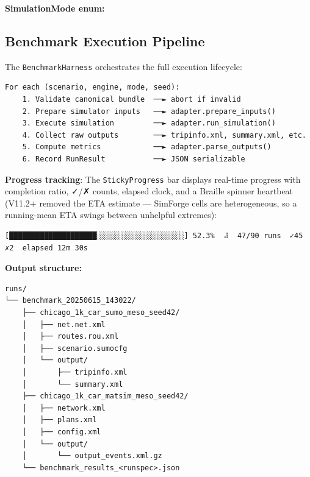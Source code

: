 \textbf{SimulationMode enum:}

\begin{Shaded}
\begin{Highlighting}[]
\OperatorTok{=}   
\OperatorTok{=}     
\end{Highlighting}
\end{Shaded}

\subsection{Benchmark Execution
Pipeline}\label{352-benchmark-execution-pipeline}

The \texttt{BenchmarkHarness} orchestrates the full execution lifecycle:

\begin{verbatim}
For each (scenario, engine, mode, seed):
    1. Validate canonical bundle  ──► abort if invalid
    2. Prepare simulator inputs   ──► adapter.prepare_inputs()
    3. Execute simulation         ──► adapter.run_simulation()
    4. Collect raw outputs        ──► tripinfo.xml, summary.xml, etc.
    5. Compute metrics            ──► adapter.parse_outputs()
    6. Record RunResult           ──► JSON serializable
\end{verbatim}

\textbf{Progress tracking}: The \texttt{StickyProgress} bar displays
real-time progress with completion ratio, ✓/✗ counts, elapsed clock, and
a Braille spinner heartbeat (V11.2+ removed the ETA estimate ---
SimForge cells are heterogeneous, so a running-mean ETA swings between
unhelpful extremes):

\begin{verbatim}
[████████████████████░░░░░░░░░░░░░░░░░░░░] 52.3%  ⠼  47/90 runs  ✓45 ✗2  elapsed 12m 30s
\end{verbatim}

\textbf{Output structure:}

\begin{verbatim}
runs/
└── benchmark_20250615_143022/
    ├── chicago_1k_car_sumo_meso_seed42/
    │   ├── net.net.xml
    │   ├── routes.rou.xml
    │   ├── scenario.sumocfg
    │   └── output/
    │       ├── tripinfo.xml
    │       └── summary.xml
    ├── chicago_1k_car_matsim_meso_seed42/
    │   ├── network.xml
    │   ├── plans.xml
    │   ├── config.xml
    │   └── output/
    │       └── output_events.xml.gz
    └── benchmark_results_<runspec>.json
\end{verbatim}

